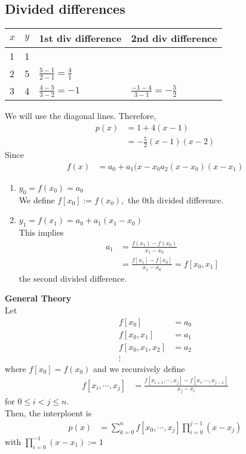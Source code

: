 \documentclass[11pt,oneside]{book}
\theoremstyle{break}
\theoremstyle{break}
\begin{document}
\subsection[Divided differences]{Divided differences}\begin{center}
\begin{tabular}{|l|l|l|l|}
\hline
$x$ & $y$ & 1st div difference  & 2nd div difference \\ \hline
1 & 1 &  &  \\ \hline
2 & 5 & $\frac{5-1}{2-1}=\frac{4}{1}$ &  \\ \hline
3 & 4 & $\frac{4-5}{3-2}=-1$  & $\frac{-1-4}{3-1}=-\frac{5}{2}$ \\ \hline
\end{tabular}
\end{center}
We will use the diagonal lines. Therefore, \begin{align*}
p(x)&=1+4(x-1)\\
&=-\frac{5}{2}(x-1)(x-2)
\end{align*}
Since \begin{align*}
f(x)&=a_0+a_1(x-x_0a_2(x-x_0)(x-x_1)
\end{align*}
\begin{enumerate}
\item $y_0=f(x_0)=a_0$\\
We define $f[x_0]:=f(x_0),$ the 0th divided difference.
\item $y_1=f(x_1)=a_0+a_1(x_1-x_0)$\\
This implies \begin{align*}
a_1&=\frac{f(x_1)-f(x_0)}{x_1-x_0}\\
&=\frac{f[x_1]-f[x_0]}{x_1-x_0}=f[x_0,x_1]
\end{align*}
the second divided difference.
\end{enumerate}
\textbf{General Theory}\\
Let \begin{align*}
f[x_0]&=a_0\\
f[x_0,x_1]&=a_1\\
f[x_0,x_1,x_2]&=a_2\\
\vdots
\end{align*}
where $f[x_0]=f(x_0)$ and we recursively define\begin{align*}
f[x_i,\cdots,x_j]&=\frac{f[x_{i+1},\cdots,x_j]-f[x_i,\cdots,x_{j-1}]}{x_j-x_i}
\end{align*}
for $0\leq i<j\leq n$.\\
Then, the interploent is \begin{align*}
p(x)&=\sum_{k=0}^nf[x_0,\cdots,x_j]\prod_{i=0}^{j-1}(x-x_j)
\end{align*}
with $\prod_{i=0}^{-1}(x-x_1):=1$\\
\end{document}
